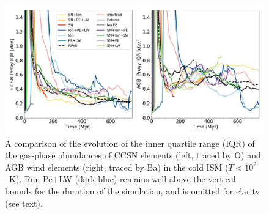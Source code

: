 \documentclass[twocolumn]{aastex62}
\newcommand{\pelwstyle}{dark blue}
\begin{document}

\begin{figure}
  \centering
  \includegraphics[width=0.95\linewidth]{figures/physics_comparison_IQR}
  \caption{A comparison of the evolution of the inner quartile range (IQR) of the gas-phase abundances of CCSN elements (left, traced by O) and AGB wind elements (right, traced by Ba) in the cold ISM ($T < 10^2$~K). Run Pe+LW (\pelwstyle) remains well above the vertical bounds for the duration of the simulation, and is omitted for clarity (see text).}
  \label{fig:mixing}
\end{figure}
\end{document}
